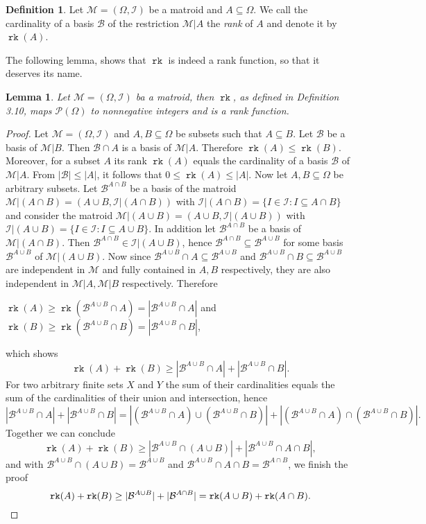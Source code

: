 \documentclass[12pt,a4paper, twoside, autooneside=false]{scrartcl}
\newtheorem{lemma}[theorem]{Lemma}
\theoremstyle{definition}
\newtheorem{definition}[theorem]{Definition}
\theoremstyle{remark}
\numberwithin{equation}{section}
\DeclareMathOperator{\rk}{\mathtt{rk}}
\newcommand{\M}{\mathcal{M}} %
\begin{document}
\begin{definition}
Let $\M = (\Omega, \mathcal{I})$ be a matroid and $A \subseteq \Omega$. We call the cardinality of a basis $\mathcal{B}$ of the restriction $\M|A$ the \textit{rank} of $A$ and denote it by $\rk(A)$. 
\end{definition}
The following lemma, shows that $\rk$ is indeed a rank function, so that it deserves its name.
\begin{lemma}
Let $\M = (\Omega, \mathcal{I})$ ba a matroid, then $\rk$, as defined in Definition 3.10, maps $\mathcal{P}(\Omega)$ to nonnegative integers and is a rank function.
\end{lemma}
\begin{proof}
Let $\M = (\Omega, \mathcal{I})$ and $A,B \subseteq \Omega$ be subsets such that $A \subseteq B$. Let $\mathcal{B}$ be a basis of $\M|B$. Then $\mathcal{B} \cap A$ is a basis of $\M|A$. Therefore $\rk(A) \leq \rk(B)$. Moreover, for a subset $A$ its rank $\rk(A)$ equals the cardinality of a basis $\mathcal{B}$ of $\M|A$. From $|\mathcal{B}| \leq |A|$, it follows that $0 \leq \rk(A) \leq |A|$. 
\noindent
Now let $A,B \subseteq \Omega$ be arbitrary subsets. Let $\mathcal{B}^{A \cap B}$ be a basis of the matroid $\M{|{(A \cap B)}} = (A \cup B, \mathcal{I}|(A \cap B))$ with $\mathcal{I}|{(A \cap B)} = \{I \in \mathcal{I}: I \subseteq A \cap B\}$ and consider the matroid $\M{|{(A \cup B)}} = (A \cup B, \mathcal{I}|{(A \cup B)})$ with $\mathcal{I}|{(A \cup B)} = \{ I \in \mathcal{I}: I \subseteq A \cup B\}$. In addition let $\mathcal{B}^{A \cap B}$ be a basis of $\M{|{(A \cap B)}}$. Then $\mathcal{B}^{A \cap B} \in \mathcal{I}|{(A \cup B)}$, hence $\mathcal{B}^{A \cap B} \subseteq \mathcal{B}^{A \cup B}$ for some basis $\mathcal{B}^{A \cup B}$ of $\M{|{(A \cup B)}}$. Now since $\mathcal{B}^{A \cup B} \cap A \subseteq \mathcal{B}^{A \cup B}$ and $\mathcal{B}^{A \cup B} \cap B \subseteq \mathcal{B}^{A \cup B}$ are independent in $\M$ and fully contained in $A,B$ respectively, they are also independent in $\M{|{A}}, \M{|{B}}$ respectively. Therefore \begin{center} $\rk(A) \geq \rk(\mathcal{B}^{A \cup B}\cap A) =  |\mathcal{B}^{A \cup B} \cap A|$ and $\rk(B) \geq \rk(\mathcal{B}^{A \cup B} \cap B) = |\mathcal{B}^{A \cup B}\cap B|$,\end{center}which shows
\[
\rk(A) + \rk(B) \geq |\mathcal{B}^{A \cup B} \cap A| + |\mathcal{B}^{A \cup B} \cap B|.
\]
For two arbitrary finite sets $X$ and $Y$ the sum of their cardinalities equals the sum of the cardinalities of their union and intersection, hence 
\[
|\mathcal{B}^{A \cup B} \cap A| + |\mathcal{B}^{A \cup B} \cap B| = |(\mathcal{B}^{A \cup B} \cap A) \cup (\mathcal{B}^{A \cup B} \cap B)| + |(\mathcal{B}^{A \cup B} \cap A) \cap (\mathcal{B}^{A \cup B} \cap B)|.
\]
Together we can conclude 
\[
\rk(A) + \rk(B) \geq |\mathcal{B}^{A \cup B} \cap (A \cup B)| + |\mathcal{B}^{A \cup B} \cap A \cap B|,
\] 
and with $\mathcal{B}^{A \cup B} \cap (A \cup B) = \mathcal{B}^{A \cup B}$ and $\mathcal{B}^{A \cup B } \cap A \cap B = \mathcal{B}^{A \cap B}$, we finish the proof
\[
\rk(A) + \rk(B) \geq |\mathcal{B}^{A \cup B}| + |\mathcal{B}^{A \cap B}| = \rk(A \cup B) + \rk(A \cap B). \qedhere
\] 
\end{proof}
\end{document}
